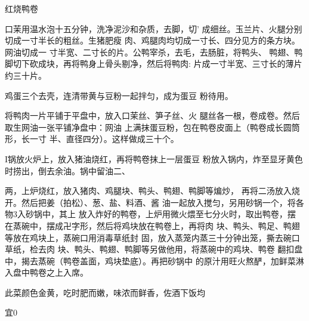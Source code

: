 \begin{recipe}{红烧鸭卷}

\ingredients



\cooking

\step 	口茉用温水泡十五分钟，洗净泥沙和杂质，去脚，切’ 成细丝。玉兰片、火腿分别切成一寸半长的粗丝。生猪肥瘦 肉、鸡腿肉均切成一寸长、四分见方的条方块。网油切成一 寸半宽、二寸长的片。公鸭宰杀，去毛，去肠脏，将鸭头、 鸭翅、鸭脚切下砍成块，再将鸭身上骨头剔净，然后将鸭肉: 片成一寸半宽、三寸长的薄片约三十片。

\step 	鸡蛋三个去壳，连清带黄与豆粉一起拌匀，成为蛋豆 粉待用。

\step 	将鸭肉一片平铺于平盘中，放入口茉丝、笋子丝、火 腿丝各一根，卷成卷。然后取生网油一张平铺净盘中：网油 上满抹蛋豆粉，包在鸭卷皮面上（鸭卷成长圆筒形，长一寸 半、直径四分）。这样做成三十个。

I锅放火炉上，放入猪油烧红，再将鸭卷抹上一层蛋豆 粉放入锅内，炸至显牙黄色时捞出，倒去余油。锅中留油二、

两，上炉烧红，放入猪肉、鸡腿块、鸭头、鸭翅、鸭脚等煸炒， 再将二汤放入烧开。然后把姜（拍松）、葱、盐、料酒、酱 油一起放入搅匀，另用砂锅一个，将各物3入砂锅中，其上 放入炸好的鸭卷，上炉用微火煨至七分火时，取出鸭卷，摆 在蒸碗中，摆成卍字形，然后将鸡块放在鸭卷上，再将肉 块、鸭头、鸭足、鸭翅等放在鸡块上，蒸碗口用消毒草纸封 固，放入蒸笼内蒸三十分钟出笼，撕去碗口草纸，检去肉 块、鸭头、鸭翅、鸭脚等另做他用，将蒸碗中的鸡块、鸭卷 翻扣盘中，揭去蒸碗（鸭卷盖面，鸡块垫底）。再把砂锅中 的原汁用旺火熬酽，加鲜菜淋入盘中鸭卷之上入席。

\notes

此菜颜色金黄，吃时肥而嫩，味浓而鲜香，佐酒下饭均

宜0

\end{recipe}


